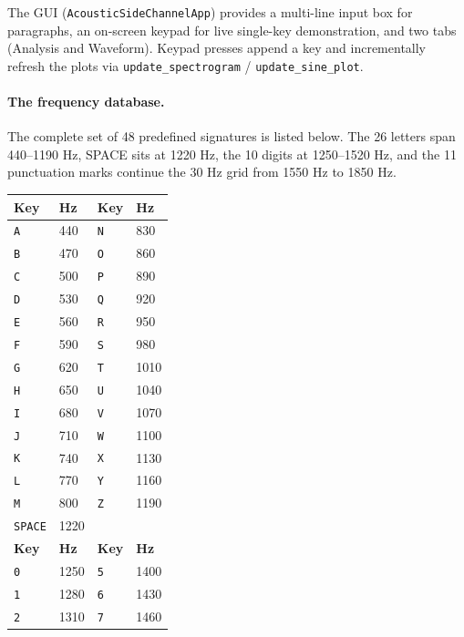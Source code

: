 \documentclass[11pt,a4paper]{article}
\newcommand{\Key}[1]{\texttt{#1}}
\begin{document}
The GUI (\texttt{AcousticSideChannelApp}) provides a multi-line input box for
paragraphs, an on-screen keypad for live single-key demonstration, and two tabs
(Analysis and Waveform). Keypad presses append a key and incrementally refresh
the plots via \texttt{update\_spectrogram} / \texttt{update\_sine\_plot}.

\paragraph{The frequency database.}
The complete set of 48 predefined signatures is listed below. The 26 letters
span 440--1190 Hz, SPACE sits at 1220 Hz, the 10 digits at 1250--1520 Hz, and
the 11 punctuation marks continue the 30 Hz grid from 1550 Hz to 1850 Hz.

\begin{table}[H]
    \centering
    \begin{tabular}{@{}llll@{}}
        \toprule
        \textbf{Key} & \textbf{Hz} & \textbf{Key} & \textbf{Hz} \\
        \midrule
        \Key{A} & 440 & \Key{N} & 830 \\
        \Key{B} & 470 & \Key{O} & 860 \\
        \Key{C} & 500 & \Key{P} & 890 \\
        \Key{D} & 530 & \Key{Q} & 920 \\
        \Key{E} & 560 & \Key{R} & 950 \\
        \Key{F} & 590 & \Key{S} & 980 \\
        \Key{G} & 620 & \Key{T} & 1010 \\
        \Key{H} & 650 & \Key{U} & 1040 \\
        \Key{I} & 680 & \Key{V} & 1070 \\
        \Key{J} & 710 & \Key{W} & 1100 \\
        \Key{K} & 740 & \Key{X} & 1130 \\
        \Key{L} & 770 & \Key{Y} & 1160 \\
        \Key{M} & 800 & \Key{Z} & 1190 \\
        \Key{SPACE} & 1220 & & \\
        \midrule
        \textbf{Key} & \textbf{Hz} & \textbf{Key} & \textbf{Hz} \\
        \midrule
        \Key{0} & 1250 & \Key{5} & 1400 \\
        \Key{1} & 1280 & \Key{6} & 1430 \\
        \Key{2} & 1310 & \Key{7} & 1460 \\

\end{tabular}
\end{table}
\end{document}

